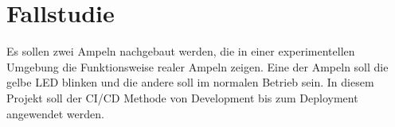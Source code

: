 \chapter{Fallstudie}

Es sollen zwei Ampeln nachgebaut werden, die  in einer experimentellen Umgebung die Funktionsweise realer Ampeln zeigen. Eine der Ampeln soll die gelbe LED blinken und die andere soll im normalen Betrieb sein. In diesem Projekt soll der CI/CD Methode von Development bis zum Deployment angewendet werden.














